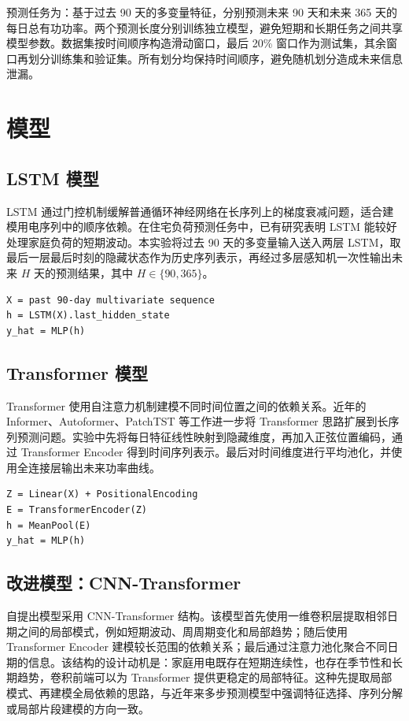\documentclass[12pt,a4paper]{ctexart}
\begin{document}
预测任务为：基于过去 90 天的多变量特征，分别预测未来 90 天和未来 365 天的每日总有功功率。两个预测长度分别训练独立模型，避免短期和长期任务之间共享模型参数。数据集按时间顺序构造滑动窗口，最后 20\% 窗口作为测试集，其余窗口再划分训练集和验证集。所有划分均保持时间顺序，避免随机划分造成未来信息泄漏。

\section{模型}

\subsection{LSTM 模型}

LSTM 通过门控机制缓解普通循环神经网络在长序列上的梯度衰减问题，适合建模用电序列中的顺序依赖\cite{lstm}。在住宅负荷预测任务中，已有研究表明 LSTM 能较好处理家庭负荷的短期波动\cite{residential-lstm}。本实验将过去 90 天的多变量输入送入两层 LSTM，取最后一层最后时刻的隐藏状态作为历史序列表示，再经过多层感知机一次性输出未来 $H$ 天的预测结果，其中 $H\in\{90,365\}$。

\begin{verbatim}
X = past 90-day multivariate sequence
h = LSTM(X).last_hidden_state
y_hat = MLP(h)
\end{verbatim}

\subsection{Transformer 模型}

Transformer 使用自注意力机制建模不同时间位置之间的依赖关系\cite{attention}。近年的 Informer、Autoformer、PatchTST 等工作进一步将 Transformer 思路扩展到长序列预测问题\cite{informer,autoformer,patchtst}。实验中先将每日特征线性映射到隐藏维度，再加入正弦位置编码，通过 Transformer Encoder 得到时间序列表示。最后对时间维度进行平均池化，并使用全连接层输出未来功率曲线。

\begin{verbatim}
Z = Linear(X) + PositionalEncoding
E = TransformerEncoder(Z)
h = MeanPool(E)
y_hat = MLP(h)
\end{verbatim}

\subsection{改进模型：CNN-Transformer}

自提出模型采用 CNN-Transformer 结构。该模型首先使用一维卷积层提取相邻日期之间的局部模式，例如短期波动、周周期变化和局部趋势；随后使用 Transformer Encoder 建模较长范围的依赖关系；最后通过注意力池化聚合不同日期的信息。该结构的设计动机是：家庭用电既存在短期连续性，也存在季节性和长期趋势，卷积前端可以为 Transformer 提供更稳定的局部特征。这种先提取局部模式、再建模全局依赖的思路，与近年来多步预测模型中强调特征选择、序列分解或局部片段建模的方向一致\cite{tft,autoformer,patchtst}。
\end{document}
